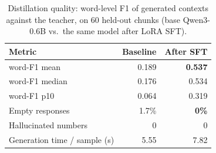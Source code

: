 \begin{table}[t]
\centering
\small
\caption{Distillation quality: word-level F1 of generated contexts against the teacher, on 60 held-out chunks (base Qwen3-0.6B vs.\ the same model after LoRA SFT).}
\label{tab:distill}
\begin{tabular}{lrr}
\toprule
Metric & Baseline & After SFT \\
\midrule
word-F1 mean & 0.189 & \textbf{0.537} \\
word-F1 median & 0.176 & 0.534 \\
word-F1 p10 & 0.064 & 0.319 \\
Empty responses & 1.7\% & \textbf{0\%} \\
Hallucinated numbers & 0 & 0 \\
Generation time / sample (s) & 5.55 & 7.82 \\
\bottomrule
\end{tabular}
\end{table}
